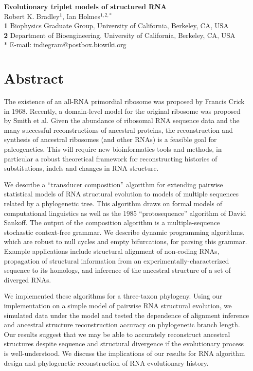 \documentclass[10pt]{article}
\date{}
\begin{document}
\begin{flushleft}
  {\Large
    \textbf{Evolutionary triplet models of structured RNA}
  }
\\
Robert K. Bradley$^{1}$, 
Ian Holmes$^{1,2,\ast}$
\\
\textbf{1} Biophysics Graduate Group, University of California, Berkeley, CA, USA
\\
\textbf{2} Department of Bioengineering, University of California, Berkeley, CA, USA
\\
$\ast$ E-mail: indiegram@postbox.biowiki.org
\end{flushleft}


\newpage
\section*{Abstract}
The existence of an all-RNA primordial ribosome was proposed by
Francis Crick in 1968.  Recently, a domain-level model for the
original ribosome was proposed by Smith et al.  Given the abundance of
ribosomal RNA sequence data and the many successful reconstructions of
ancestral proteins, the reconstruction and synthesis of ancestral
ribosomes (and other RNAs) is a feasible goal for paleogenetics.  This
will require new bioinformatics tools and methods, in particular a
robust theoretical framework for reconstructing histories of
substitutions, indels and changes in RNA structure.

We describe a ``transducer composition'' algorithm for extending
pairwise statistical models of RNA structural evolution to models of
multiple sequences related by a phylogenetic tree.  This algorithm
draws on formal models of computational linguistics as well as the
1985 ``protosequence'' algorithm of David Sankoff.  The output of the
composition algorithm is a multiple-sequence stochastic context-free
grammar.  We describe dynamic programming algorithms, which are robust
to null cycles and empty bifurcations, for parsing this grammar.
Example applications include structural alignment of non-coding RNAs,
propagation of structural information from an
experimentally-characterized sequence to its homologs, and inference
of the ancestral structure of a set of diverged RNAs.

We implemented these algorithms for a three-taxon phylogeny.  Using
our implementation on a simple model of pairwise RNA structural
evolution, we simulated data under the model and tested the dependence
of alignment inference and ancestral structure reconstruction accuracy on phylogenetic branch length.
Our results suggest that
we may be able to accurately reconstruct ancestral structures despite
sequence and structural divergence if the evolutionary process is
well-understood.
We discuss the implications of our results for RNA algorithm design
and phylogenetic reconstruction of RNA evolutionary history.
\end{document}
